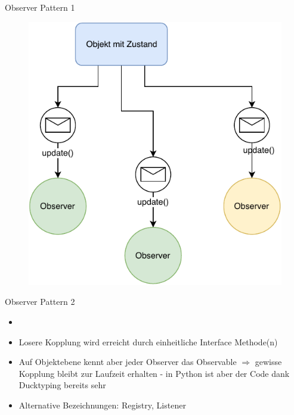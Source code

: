 \begin{frame}{Observer Pattern 1}
       \begin{figure}[!htb]
        \includegraphics[scale=0.67]{6-python3/img/observer}  %
    \end{figure}
   
\end{frame}

\begin{frame}{Observer Pattern 2}
        \begin{itemize}
        \setlength{\itemindent}{1.1in}
        \item [\textbf{Observer Pattern}]
    \end{itemize}

    \begin{itemize}
        \item Losere Kopplung wird erreicht durch einheitliche Interface Methode(n)  
        \item Auf Objektebene kennt aber jeder Observer das Observable   $\Rightarrow$ gewisse Kopplung bleibt zur Laufzeit erhalten - in Python ist aber der Code dank Ducktyping bereits sehr 
        \item Alternative Bezeichnungen: Registry, Listener
    \end{itemize}   
\end{frame}

